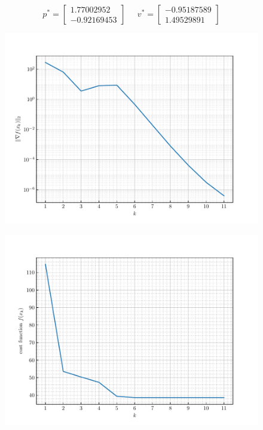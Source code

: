 \documentclass[12pt]{article}
\begin{document}
\[
    p^{*} = \begin{bmatrix}1.77002952 \\ -0.92169453
            \end{bmatrix} \; \; \; \; \;
    v^{*} = \begin{bmatrix}-0.95187589 \\ 1.49529891
            \end{bmatrix} 
\]
\vspace{-1em}
\begin{figure}[H]
    \centering
    \includegraphics[scale = 0.9]{../../src/task_8/output/gradient_norms.pdf}
\end{figure}
\vspace{-3.3em}
\begin{figure}[H]
    \centering
    \includegraphics[scale = 0.9]{../../src/task_8/output/cost_function_values.pdf}
\end{figure}
\pagebreak
\end{document}
